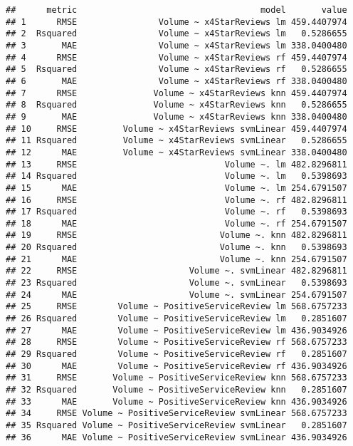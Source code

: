 \documentclass[]{article}
\begin{document}
\begin{verbatim}
##      metric                                    model       value
## 1      RMSE                Volume ~ x4StarReviews lm 459.4407974
## 2  Rsquared                Volume ~ x4StarReviews lm   0.5286655
## 3       MAE                Volume ~ x4StarReviews lm 338.0400480
## 4      RMSE                Volume ~ x4StarReviews rf 459.4407974
## 5  Rsquared                Volume ~ x4StarReviews rf   0.5286655
## 6       MAE                Volume ~ x4StarReviews rf 338.0400480
## 7      RMSE               Volume ~ x4StarReviews knn 459.4407974
## 8  Rsquared               Volume ~ x4StarReviews knn   0.5286655
## 9       MAE               Volume ~ x4StarReviews knn 338.0400480
## 10     RMSE         Volume ~ x4StarReviews svmLinear 459.4407974
## 11 Rsquared         Volume ~ x4StarReviews svmLinear   0.5286655
## 12      MAE         Volume ~ x4StarReviews svmLinear 338.0400480
## 13     RMSE                             Volume ~. lm 482.8296811
## 14 Rsquared                             Volume ~. lm   0.5398693
## 15      MAE                             Volume ~. lm 254.6791507
## 16     RMSE                             Volume ~. rf 482.8296811
## 17 Rsquared                             Volume ~. rf   0.5398693
## 18      MAE                             Volume ~. rf 254.6791507
## 19     RMSE                            Volume ~. knn 482.8296811
## 20 Rsquared                            Volume ~. knn   0.5398693
## 21      MAE                            Volume ~. knn 254.6791507
## 22     RMSE                      Volume ~. svmLinear 482.8296811
## 23 Rsquared                      Volume ~. svmLinear   0.5398693
## 24      MAE                      Volume ~. svmLinear 254.6791507
## 25     RMSE        Volume ~ PositiveServiceReview lm 568.6757233
## 26 Rsquared        Volume ~ PositiveServiceReview lm   0.2851607
## 27      MAE        Volume ~ PositiveServiceReview lm 436.9034926
## 28     RMSE        Volume ~ PositiveServiceReview rf 568.6757233
## 29 Rsquared        Volume ~ PositiveServiceReview rf   0.2851607
## 30      MAE        Volume ~ PositiveServiceReview rf 436.9034926
## 31     RMSE       Volume ~ PositiveServiceReview knn 568.6757233
## 32 Rsquared       Volume ~ PositiveServiceReview knn   0.2851607
## 33      MAE       Volume ~ PositiveServiceReview knn 436.9034926
## 34     RMSE Volume ~ PositiveServiceReview svmLinear 568.6757233
## 35 Rsquared Volume ~ PositiveServiceReview svmLinear   0.2851607
## 36      MAE Volume ~ PositiveServiceReview svmLinear 436.9034926
\end{verbatim}
\end{document}
